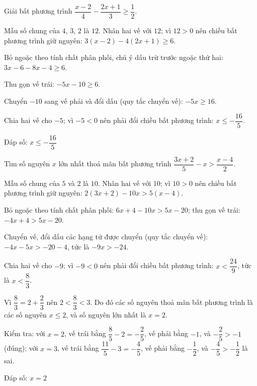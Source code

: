 \begin{problem}[9DS-BPT-004]
Giải bất phương trình $\dfrac{x - 2}{4} - \dfrac{2x + 1}{3} \geq \dfrac{1}{2}$.

\begin{solution}
Mẫu số chung của $4$, $3$, $2$ là $12$. Nhân hai vế với $12$; vì $12 > 0$ nên chiều bất phương trình giữ nguyên: $3(x - 2) - 4(2x + 1) \geq 6$.

Bỏ ngoặc theo tính chất phân phối, chú ý dấu trừ trước ngoặc thứ hai: $3x - 6 - 8x - 4 \geq 6$.

Thu gọn vế trái: $-5x - 10 \geq 6$.

Chuyển $-10$ sang vế phải và đổi dấu (quy tắc chuyển vế): $-5x \geq 16$.

Chia hai vế cho $-5$; vì $-5 < 0$ nên phải đổi chiều bất phương trình: $x \leq -\dfrac{16}{5}$.

Đáp số: $\boxed{x \leq -\dfrac{16}{5}}$
\end{solution}
\end{problem}

\begin{problem}[9DS-BPT-005]
Tìm số nguyên $x$ lớn nhất thoả mãn bất phương trình $\dfrac{3x + 2}{5} - x > \dfrac{x - 4}{2}$.

\begin{solution}
Mẫu số chung của $5$ và $2$ là $10$. Nhân hai vế với $10$; vì $10 > 0$ nên chiều bất phương trình giữ nguyên: $2(3x + 2) - 10x > 5(x - 4)$.

Bỏ ngoặc theo tính chất phân phối: $6x + 4 - 10x > 5x - 20$; thu gọn vế trái: $-4x + 4 > 5x - 20$.

Chuyển vế, đổi dấu các hạng tử được chuyển (quy tắc chuyển vế): $-4x - 5x > -20 - 4$, tức là $-9x > -24$.

Chia hai vế cho $-9$; vì $-9 < 0$ nên phải đổi chiều bất phương trình: $x < \dfrac{24}{9}$, tức là $x < \dfrac{8}{3}$.

Vì $\dfrac{8}{3} = 2 + \dfrac{2}{3}$ nên $2 < \dfrac{8}{3} < 3$. Do đó các số nguyên thoả mãn bất phương trình là các số nguyên $x \leq 2$, và số nguyên lớn nhất là $x = 2$.

Kiểm tra: với $x = 2$, vế trái bằng $\dfrac{8}{5} - 2 = -\dfrac{2}{5}$, vế phải bằng $-1$, và $-\dfrac{2}{5} > -1$ (đúng); với $x = 3$, vế trái bằng $\dfrac{11}{5} - 3 = -\dfrac{4}{5}$, vế phải bằng $-\dfrac{1}{2}$, và $-\dfrac{4}{5} > -\dfrac{1}{2}$ là sai.

Đáp số: $\boxed{x = 2}$
\end{solution}
\end{problem}

